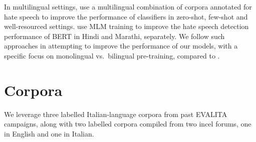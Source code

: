 \documentclass[11pt]{article}
\newcommand{\albert}{\mbox{AlBERTo}}
\begin{document}
In multilingual settings,  use a multilingual combination of corpora annotated for hate speech to improve the performance of classifiers in zero-shot, few-shot and well-resourced settings.  use MLM training to improve the hate speech detection performance of BERT in Hindi and Marathi, separately. We follow such approaches in attempting to improve the performance of our models, with a specific focus on monolingual vs.\ bilingual pre-training, compared to .


\section{Corpora}
\label{sec:corpora}

We leverage three labelled Italian-language corpora from past EVALITA
campaigns, along with two labelled corpora compiled from two incel forums, one in English and one in Italian.

\end{document}
